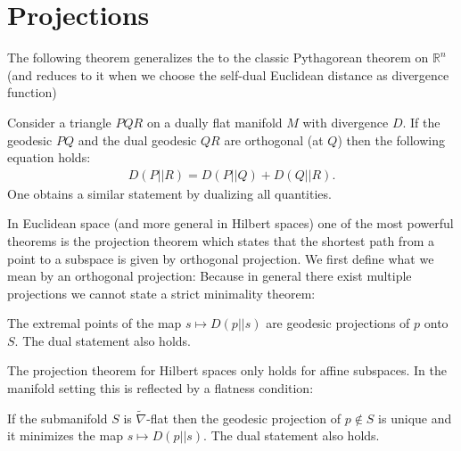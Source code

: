 \section{Projections}

    The following theorem generalizes the to the classic Pythagorean theorem on $\mathbb{R}^n$ (and reduces to it when we choose the self-dual Euclidean distance as divergence function)
    \begin{theorem}[Pythagoras]
        Consider a triangle $PQR$ on a dually flat manifold $M$ with divergence $D$. If the geodesic $PQ$ and the dual geodesic $QR$ are orthogonal (at $Q$) then the following equation holds:
        \begin{gather}
            D(P||R) = D(P||Q) + D(Q||R).
        \end{gather}
        One obtains a similar statement by dualizing all quantities.
    \end{theorem}

    In Euclidean space (and more general in Hilbert spaces) one of the most powerful theorems is the projection theorem which states that the shortest path from a point to a subspace is given by orthogonal projection. We first define what we mean by an orthogonal projection:
    Because in general there exist multiple projections we cannot state a strict minimality theorem:
    \begin{theorem}
        The extremal points of the map $s\mapsto D(p||s)$ are geodesic projections of $p$ onto $S$. The dual statement also holds.
    \end{theorem}
    The projection theorem for Hilbert spaces only holds for affine subspaces. In the manifold setting this is reflected by a flatness condition:
    \begin{property}
        If the submanifold $S$ is $\widetilde{\nabla}$-flat then the geodesic projection of $p\not\in S$ is unique and it minimizes the map $s\mapsto D(p||s)$. The dual statement also holds.
    \end{property}

